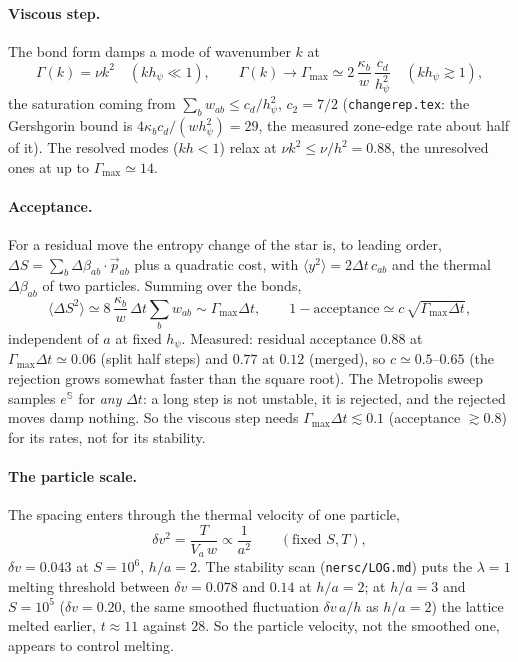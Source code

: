 \documentclass[11pt,aps,preprint,nofootinbib,superscriptaddress,tightenlines]{revtex4-2}
\def\st{\begin{equation}}
\def\stp{\end{equation}}
\newcommand{\avg}[1]{\langle #1\rangle}
\let\oldparagraph\paragraph
\renewcommand{\paragraph}{\par\bigskip\oldparagraph}
\begin{document}
\paragraph{Viscous step.}  The bond form damps a mode of wavenumber $k$ at
\st
\Gamma(k)=\nu k^2\quad(kh_\psi\ll1),\qquad
\Gamma(k)\to\Gamma_{\max}\simeq2\,\frac{\kappa_b}{w}\,\frac{c_d}{h_\psi^2}\quad(kh_\psi\gtrsim1),
\label{Gamma}
\stp
the saturation coming from $\sum_bw_{ab}\le c_d/h_\psi^2$, $c_2=7/2$ (\texttt{changerep.tex}: the
Gershgorin bound is $4\kappa_bc_d/(wh_\psi^2)=29$, the measured zone-edge rate about half of it).
The resolved modes ($kh<1$) relax at $\nu k^2\le\nu/h^2=0.88$, the unresolved ones at
up to $\Gamma_{\max}\simeq14$.

\paragraph{Acceptance.}  For a residual move the entropy change of the star is, to
leading order, $\Delta S=\sum_b\Delta\beta_{ab}\cdot\vec p_{ab}$ plus a quadratic cost, with
$\avg{y^2}=2\Delta t\,c_{ab}$ and the thermal $\Delta\beta_{ab}$ of two particles.  Summing over
the bonds,
\st
\avg{\Delta S^2}\simeq 8\,\frac{\kappa_b}{w}\,\Delta t\sum_bw_{ab}\sim\Gamma_{\max}\Delta t ,
\qquad 1-\text{acceptance}\simeq c\,\sqrt{\Gamma_{\max}\Delta t} ,
\label{acc}
\stp
independent of $a$ at fixed $h_\psi$.  Measured: residual acceptance $0.88$ at
$\Gamma_{\max}\Delta t\simeq0.06$ (split half steps) and $0.77$ at $0.12$ (merged), so $c\simeq0.5$--$0.65$
(the rejection grows somewhat faster than the square root).
The Metropolis sweep samples $e^{\mathbb S}$ for \emph{any} $\Delta t$: a long step is not
unstable, it is rejected, and the rejected moves damp nothing.  So the viscous step
needs $\Gamma_{\max}\Delta t\lesssim0.1$ (acceptance $\gtrsim0.8$) for its rates, not for its stability.

\paragraph{The particle scale.}  The spacing enters through the thermal velocity of
one particle,
\st
\delta v^2=\frac{T}{V_a\,w}\propto\frac1{a^2}\qquad(\text{fixed }S,T),
\label{dv}
\stp
$\delta v=0.043$ at $S=10^6$, $h/a=2$.  The stability scan (\texttt{nersc/LOG.md}) puts the
$\lambda=1$ melting threshold between $\delta v=0.078$ and $0.14$ at $h/a=2$; at $h/a=3$
and $S=10^5$ ($\delta v=0.20$, the same smoothed fluctuation $\delta v\,a/h$ as $h/a=2$) the
lattice melted earlier, $t\approx11$ against $28$.  So the particle velocity, not the
smoothed one, appears to control melting.
\end{document}

